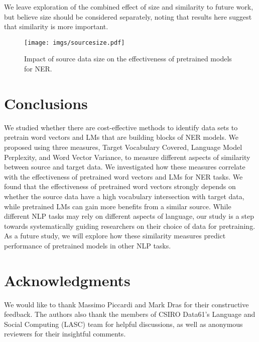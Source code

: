 \documentclass[11pt,a4paper]{article}
\begin{document}
We leave exploration of the combined effect of size and similarity to future work, but believe size should be considered separately, noting that results here suggest that similarity is more important.


\begin{figure}[pt!]
    \centering
    \texttt{[image: imgs/sourcesize.pdf]}
    \caption{Impact of source data size on the effectiveness of pretrained models for NER.}\label{fig:impact-of-size}
\end{figure}



\section{Conclusions}
We studied whether there are cost-effective methods to identify data sets to pretrain word vectors and LMs that are building blocks of NER models. 
We proposed using three measures, Target Vocabulary Covered, Language Model Perplexity, and Word Vector Variance, to measure different aspects of similarity between source and target data. 
We investigated how these measures correlate with the effectiveness of pretrained word vectors and LMs for NER tasks. 
We found that the effectiveness of pretrained word vectors strongly depends on whether the source data have a high vocabulary intersection with target data, while pretrained LMs can gain more benefits from a similar source. 
While different NLP tasks may rely on different aspects of language, our study is a step towards systematically guiding researchers on their choice of data for pretraining. 
As a future study, we will explore how these similarity measures predict performance of pretrained models in other NLP tasks.
 
\section*{Acknowledgments} 
We would like to thank Massimo Piccardi and Mark Dras for their constructive feedback. The authors also thank the members of CSIRO Data61's Language and Social Computing (LASC) team for helpful discussions, as well as anonymous reviewers for their insightful comments.



\end{document}
